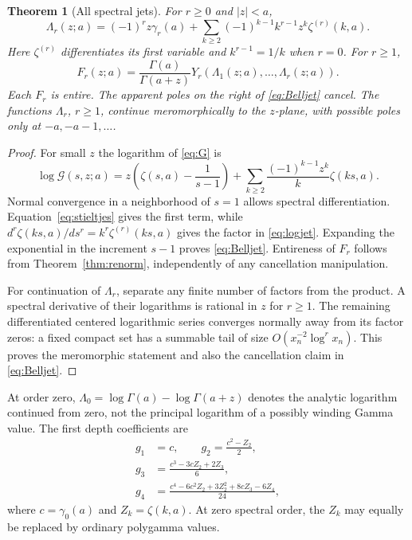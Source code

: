 \documentclass[11pt]{article}
\numberwithin{equation}{section}
\newtheorem{theorem}{Theorem}[section]
\theoremstyle{definition}\newtheorem{definition}[theorem]{Definition}
\theoremstyle{remark}\newtheorem{remark}[theorem]{Remark}
\newcommand{\G}{\mathcal G}\newcommand{\F}{\mathfrak F}
\begin{document}
\begin{theorem}[All spectral jets]
\label{thm:jets}
For $r\ge0$ and $|z|<a$,
\begin{equation}
 \boxed{\Lambda_r(z;a)=(-1)^r z\gamma_r(a)+
       \sum_{k\ge2}(-1)^{k-1}k^{r-1}z^k\zeta^{(r)}(k,a)}.
 \label{eq:logjet}
\end{equation}
Here $\zeta^{(r)}$ differentiates its first variable and $k^{r-1}=1/k$
when $r=0$. For $r\ge1$,
\begin{equation}
 F_r(z;a)=\frac{\Gamma(a)}{\Gamma(a+z)}
          Y_r(\Lambda_1(z;a),\ldots,\Lambda_r(z;a)).
 \label{eq:Belljet}
\end{equation}
Each $F_r$ is entire. The apparent poles on the right of \eqref{eq:Belljet}
cancel. The functions $\Lambda_r$, $r\ge1$, continue meromorphically to the
$z$-plane, with possible poles only at $-a,-a-1,\ldots$.
\end{theorem}
\begin{proof}
For small $z$ the logarithm of \eqref{eq:G} is
\begin{equation}
 \log\G(s,z;a)=z\left(\zeta(s,a)-\frac1{s-1}\right)
    +\sum_{k\ge2}\frac{(-1)^{k-1}z^k}{k}\zeta(ks,a).
 \label{eq:logG}
\end{equation}
Normal convergence in a neighborhood of $s=1$ allows spectral
differentiation. Equation~\eqref{eq:stieltjes} gives the first term, while
$d^r\zeta(ks,a)/ds^r=k^r\zeta^{(r)}(ks,a)$ gives the factor in
\eqref{eq:logjet}. Expanding the exponential in the increment $s-1$
proves \eqref{eq:Belljet}. Entireness of $F_r$ follows from
Theorem~\ref{thm:renorm}, independently of any cancellation manipulation.

For continuation of $\Lambda_r$, separate any finite number of factors from
the product. A spectral derivative of their logarithms is rational in $z$
for $r\ge1$. The remaining differentiated centered logarithmic series
converges normally away from its factor zeros: a fixed compact set has a
summable tail of size $O(x_n^{-2}\log^r x_n)$. This proves the meromorphic
statement and also the cancellation claim in \eqref{eq:Belljet}.
\end{proof}

At order zero, $\Lambda_0=\log\Gamma(a)-\log\Gamma(a+z)$ denotes the
analytic logarithm continued from zero, not the principal logarithm of a
possibly winding Gamma value. The first depth coefficients are
\begin{align}
 g_1&=c,\qquad g_2=\frac{c^2-Z_2}{2},\\
 g_3&=\frac{c^3-3cZ_2+2Z_3}{6},\\
 g_4&=\frac{c^4-6c^2Z_2+3Z_2^2+8cZ_3-6Z_4}{24},
 \label{eq:gtable}
\end{align}
where $c=\gamma_0(a)$ and $Z_k=\zeta(k,a)$. At zero spectral order, the
$Z_k$ may equally be replaced by ordinary polygamma values.
\end{document}
